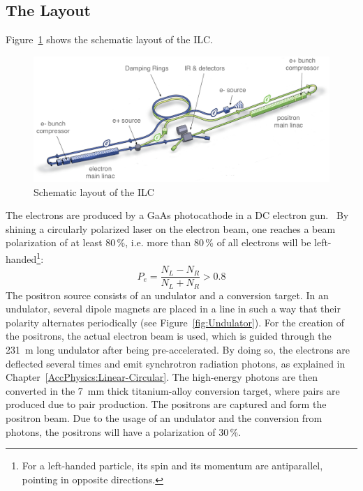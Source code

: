 \subsection{The Layout}
Figure~\ref{fig:ILC_Layout} shows the schematic layout of the ILC.
\begin{figure}
\centering
\includegraphics[width=\textwidth]{Figures/ILC_layout_edited.png}
\caption[Schematic layout of the ILC]{Schematic layout of the ILC~\cite[cf. p. 9]{TDR1}}
\label{fig:ILC_Layout}
\end{figure}
The electrons are produced by a GaAs photocathode in a DC electron gun.~\cite[p. 13]{TDR32}
By shining a circularly polarized laser on the electron beam, one reaches a beam polarization of at least 80\,\%, i.e. more than 80\,\% of all electrons will be left-handed\footnote{For a left-handed particle, its spin and its momentum are antiparallel, pointing in opposite directions.}:
\begin{equation}
 P_e = \frac{N_L-N_R}{N_L+N_R} > 0.8
\end{equation}
The positron source consists of an undulator and a conversion target.
In an undulator, several dipole magnets are placed in a line in such a way that their polarity alternates periodically (see Figure~\ref{fig:Undulator}).
For the creation of the positrons, the actual electron beam is used, which is guided through the  \SI{231}{\meter} long undulator after being pre-accelerated.
By doing so, the electrons are deflected several times and emit synchrotron radiation photons, as explained in Chapter~\ref{AccPhysics:Linear-Circular}.
The high-energy photons are then converted in the \SI{7}{\milli\meter} thick titanium-alloy conversion target, where \positron \electron pairs are produced due to pair production.
The positrons are captured and form the positron beam.
Due to the usage of an undulator and the conversion from photons, the positrons will have a polarization of 30\,\%.~\cite[p. 14]{TDR32}
